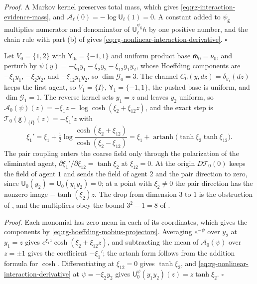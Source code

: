 \noindent\emph{Proof.}
A Markov kernel preserves total mass, which gives
\eqref{eq:rg-interaction-evidence-mass}, and
$\mathcal A_\ell(0)=-\log\mathsf U_\ell(1)=0$. A constant added to $\psi_{\mathsf g}$
multiplies numerator and denominator of $\mathsf U_\ell^{\psi_{\mathsf g}}h$ by one
positive number, and the chain rule with part (b) of
 gives
\eqref{eq:rg-nonlinear-interaction-derivative}. $\square$

Let $V_0=\{1,2\}$ with $\mathsf Y_{0i}=\{-1,1\}$ and uniform product base
$\bar{\mathsf m}_0=\nu_0$, and perturb by
$\psi(y)=-\xi_1y_1-\xi_2y_2-\xi_{12}y_1y_2$, whose Hoeffding components are
$-\xi_1y_1$, $-\xi_2y_2$, and $-\xi_{12}y_1y_2$, so $\dim\mathcal G_0=3$. The
channel $C_0(y,dz)=\delta_{y_1}(dz)$ keeps the first agent, so $V_1=\{I\}$,
$\mathsf Y_1=\{-1,1\}$, the pushed base is uniform, and $\dim\mathcal G_1=1$. The
reverse kernel sets $y_1=z$ and leaves $y_2$ uniform, so
$\mathcal A_0(\psi)(z)=-\xi_1z-\log\cosh(\xi_2+\xi_{12}z)$, and the exact step is
$\mathcal T_0(\mathsf g)_{\{I\}}(z)=-\xi_1'z$ with
\[
\xi_1'=\xi_1+\tfrac12\log\frac{\cosh(\xi_2+\xi_{12})}{\cosh(\xi_2-\xi_{12})}
=\xi_1+\operatorname{artanh}\bigl(\tanh\xi_2\tanh\xi_{12}\bigr).
\]
The pair coupling enters the coarse field only through the polarization of the
eliminated agent, $\partial\xi_1'/\partial\xi_{12}=\tanh\xi_2$ at $\xi_{12}=0$. At
the origin $D\mathcal T_0(0)$ keeps the field of agent $1$ and sends the field of
agent $2$ and the pair direction to zero, since
$\mathsf U_0(y_2)=\mathsf U_0(y_1y_2)=0$; at a point with $\xi_2\ne0$ the pair
direction has the nonzero image $-\tanh(\xi_2)z$. The drop from dimension $3$ to
$1$ is the obstruction of ,
and the multipliers obey the bound $3^2-1=8$ of
. 

\noindent\emph{Proof.}
Each monomial has zero mean in each of its coordinates, which gives the components
by \eqref{eq:rg-hoeffding-mobius-projectors}. Averaging $e^{-\psi}$ over $y_2$ at
$y_1=z$ gives $e^{\xi_1z}\cosh(\xi_2+\xi_{12}z)$, and subtracting the mean of
$\mathcal A_0(\psi)$ over $z=\pm1$ gives the coefficient $-\xi_1'$; the artanh form
follows from the addition formula for $\cosh$. Differentiating at $\xi_{12}=0$
gives $\tanh\xi_2$, and \eqref{eq:rg-nonlinear-interaction-derivative} at
$\psi=-\xi_2y_2$ gives $\mathsf U_0^{\psi}(y_1y_2)(z)=z\tanh\xi_2$. $\square$

